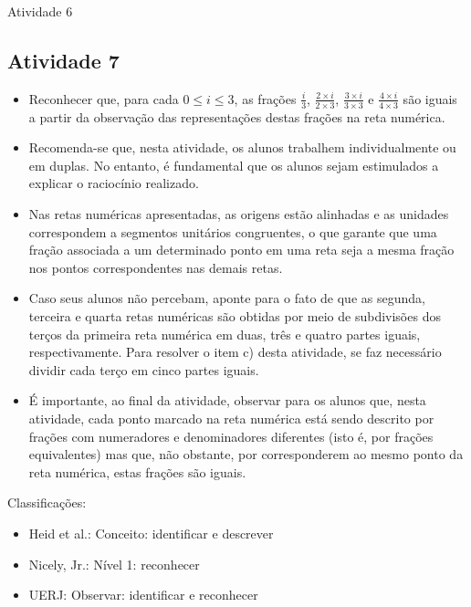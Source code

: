 \begin{multicols}{2}
\begin{resposta*}{Atividade 6}
\end{resposta*}

\Bg

\subsection{Atividade 7}

\begin{itemize} %
    \item       Reconhecer que, para cada       $0 \leq i \leq 3$, as frações    
   $\frac{i}{3}$,       $\frac{2 \times i}{2 \times 3 }$,       $\frac{3 \times 
i}{3 \times 3}$       e       $\frac{4 \times i}{4 \times 3}$       são iguais a 
partir da observação das representações destas frações na reta numérica.
\end{itemize} %
  
  
 
\begin{itemize} %
    \item       Recomenda-se que, nesta atividade, os alunos trabalhem 
individualmente ou em duplas. No entanto, é fundamental que os alunos sejam 
estimulados a explicar o raciocínio realizado.
    \item       Nas retas numéricas apresentadas, as origens estão alinhadas e 
as unidades correspondem a segmentos unitários congruentes, o que garante que 
uma fração associada a um determinado ponto em uma reta seja a mesma fração nos 
pontos correspondentes nas demais retas.
    \item       Caso seus alunos não percebam, aponte para o fato de que as 
segunda, terceira e quarta retas numéricas são obtidas por meio de subdivisões 
dos terços da primeira reta numérica em duas, três e quatro partes iguais, 
respectivamente. Para resolver o item c) desta atividade, se faz necessário 
dividir cada terço em cinco partes iguais.
    \item       É importante, ao final da atividade, observar para os alunos 
que, nesta atividade, cada ponto marcado na reta numérica está sendo descrito 
por frações com numeradores e denominadores diferentes (isto é, por frações 
equivalentes) mas que, não obstante, por corresponderem ao mesmo ponto da reta 
numérica, estas frações são iguais.
\end{itemize} %
  
  
  Classificações:  
\begin{itemize} %
    \item       Heid et al.: Conceito: identificar e descrever
    \item       Nicely, Jr.: Nível 1: reconhecer
    \item       UERJ: Observar: identificar e reconhecer
\end{itemize} %
  

\end{multicols}
